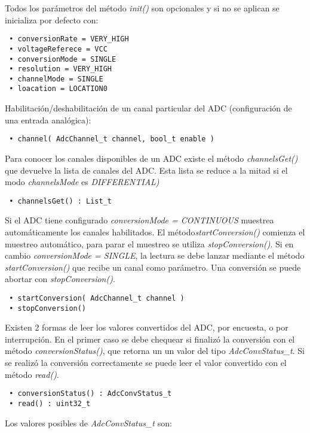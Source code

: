 Todos los parámetros del método \emph{init()} son opcionales y si no se aplican se inicializa por defecto con:

\begin{verbatim}
 • conversionRate = VERY_HIGH
 • voltageReferece = VCC
 • conversionMode = SINGLE
 • resolution = VERY_HIGH
 • channelMode = SINGLE
 • loacation = LOCATION0
\end{verbatim}

Habilitación/deshabilitación de un canal particular del ADC (configuración de una entrada analógica):

\begin{verbatim}
 • channel( AdcChannel_t channel, bool_t enable )
\end{verbatim}

Para conocer los canales disponibles de un ADC existe el método 
\emph{channelsGet()} que devuelve la lista de canales del ADC. Esta lista se reduce a la mitad si el modo \emph{channelsMode} es \emph{DIFFERENTIAL)}

\begin{verbatim}
 • channelsGet() : List_t
\end{verbatim}

Si el ADC tiene configurado \emph{conversionMode = CONTINUOUS} muestrea automáticamente los canales habilitados. El método\emph{startConversion()} comienza el muestreo automático, para parar el muestreo se utiliza \emph{stopConversion()}. Si en cambio \emph{conversionMode = SINGLE}, la lectura se debe lanzar mediante el método \emph{startConversion()} que recibe un canal como parámetro. 
Una conversión se puede abortar con \emph{stopConversion()}.

\begin{verbatim}
 • startConversion( AdcChannel_t channel )
 • stopConversion()
\end{verbatim}

Existen 2 formas de leer los valores convertidos del ADC, por encuesta, o por interrupción. En el primer caso se debe chequear si finalizó la conversión con el método \emph{conversionStatus()}, que retorna un un valor del tipo \emph{AdcConvStatus\_t}. Si se realizó la conversión correctamente se puede leer el valor convertido con el método \emph{read()}.

\begin{verbatim}
 • conversionStatus() : AdcConvStatus_t
 • read() : uint32_t
\end{verbatim}

Los valores posibles de \emph{AdcConvStatus\_t} son: 

